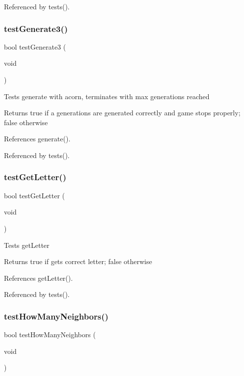 Referenced by tests().

\mbox{\label{tests_8h_a165a4547fb67d114da1e6d6b630efe90}} 
\subsubsection{test\+Generate3()}
{\footnotesize\ttfamily bool test\+Generate3 (\begin{DoxyParamCaption}\item[{void}]{ }\end{DoxyParamCaption})}

Tests generate with acorn, terminates with max generations reached \begin{DoxyReturn}{Returns}
true if a generations are generated correctly and game stops properly; false otherwise 
\end{DoxyReturn}


References generate().



Referenced by tests().

\mbox{\label{tests_8h_a9b70c29f84da569aff4c79611734cae7}} 
\subsubsection{test\+Get\+Letter()}
{\footnotesize\ttfamily bool test\+Get\+Letter (\begin{DoxyParamCaption}\item[{void}]{ }\end{DoxyParamCaption})}

Tests get\+Letter \begin{DoxyReturn}{Returns}
true if gets correct letter; false otherwise 
\end{DoxyReturn}


References get\+Letter().



Referenced by tests().

\mbox{\label{tests_8h_a61a9bf4e92f96b3669a4eb9c2af3eca9}} 
\subsubsection{test\+How\+Many\+Neighbors()}
{\footnotesize\ttfamily bool test\+How\+Many\+Neighbors (\begin{DoxyParamCaption}\item[{void}]{ }\end{DoxyParamCaption})}

